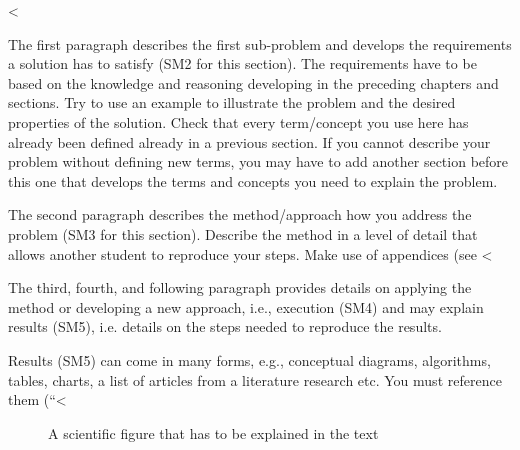 \documentclass[runningheads,a4paper,english]{llncs}[2018/03/10]
\begin{document}
{%
<%

\textsf{The first paragraph describes the first sub-problem and develops the requirements a solution has to satisfy (SM2 for this section).} The requirements have to be based on the knowledge and reasoning developing in the preceding chapters and sections. Try to use an example to illustrate the problem and the desired properties of the solution. Check that every term/concept you use here has already been defined already in a previous section. If you cannot describe your problem without defining new terms, you may have to add another section before this one that develops the terms and concepts you need to explain the problem.

\textsf{The second paragraph describes the method/approach how you address the problem (SM3 for this section).} Describe the method in a level of detail that allows another student to reproduce your steps. Make use of appendices (see <%

\textsf{The third, fourth, and following paragraph provides details on applying the method or developing a new approach, i.e., execution (SM4) and may explain results (SM5)}, i.e. details on the steps needed to reproduce the results. 

Results (SM5) can come in many forms, e.g., conceptual diagrams, algorithms, tables, charts, a list of articles from a literature research etc. You must reference them (``<%

\begin{figure}
    \centering
    \caption{A scientific figure that has to be explained in the text}
    \label{fig:my_label}
\end{figure}

}
\end{document}
